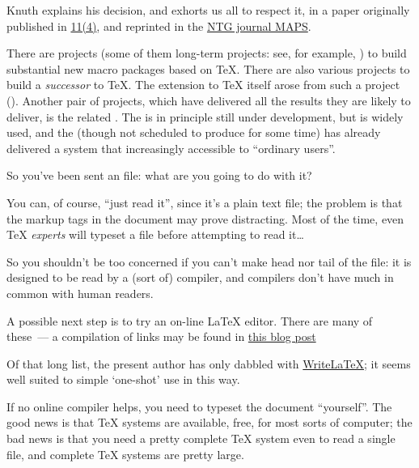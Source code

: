 Knuth explains his decision, and exhorts us all to respect it, in a
paper originally published in %
\href{http://tug.org/TUGboat/Articles/tb11-4/tb30knut.pdf}{\TUGboat{} 11(4)},
and reprinted in the %
\href{http://www.ntg.nl/maps/pdf/5_34.pdf}{NTG journal MAPS}.

There are projects (some of them long-term
projects: see, for example,
)
to build substantial new macro packages based on \TeX{}.  There are
also various projects to build a \emph{successor} to \TeX{}.  The
 extension to \TeX{} itself arose from such a
project ().  Another pair of projects, which have delivered
all the results they are likely to deliver, is the
related %
.  The %
 is in principle still under
development, but is widely used, and the %
 (though not scheduled to produce
for some time) has already delivered a system that increasingly
accessible to ``ordinary users''.


So you've been sent an \AllTeX{} file: what are you going to do with
it?

You can, of course, ``just read it'', since it's a plain text file;
the problem is that the markup tags in the document may prove
distracting.  Most of the time, even \TeX{} \emph{experts} will
typeset a \AllTeX{} file before attempting to read it\nobreakspace{}\dots{}

So you shouldn't be too concerned if you can't make head nor tail of
the file: it is designed to be read by a (sort of) compiler, and
compilers don't have much in common with human readers.

A possible next step is to try an on-line \LaTeX{} editor.  There are
many of these~--- a compilation of links may be found in %
\href{http://texblog.net/latex-link-archive/online-compiler/}{this blog post}

Of that long list, the present author has only dabbled with 
\href{https://www.writelatex.com/}{Write\LaTeX{}}; it seems well
suited to simple `one-shot' use in this way.

If no online compiler helps, you need to typeset the document
``yourself''.  The good news is that \TeX{} systems are available,
free, for most sorts of computer; the bad news is that you need a
pretty complete \TeX{} system even to read a single file, and complete
\TeX{} systems are pretty large.

